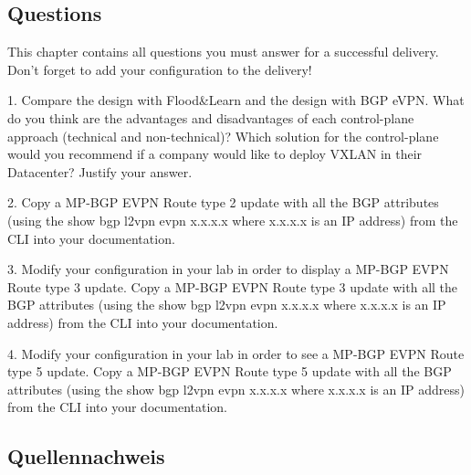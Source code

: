 \documentclass[11pt,titlepage]{article}
\newenvironment{shadedquotation}
 {\begin{shaded*}
  \quoting[leftmargin=0pt, vskip=0pt]
 }
 {\endquoting
 \end{shaded*}
}
\begin{document}
\subsection{Questions}
This chapter contains all questions you must answer for a successful delivery. Don’t forget to add
your configuration to the delivery!
\begin{shadedquotation}
	1. Compare the design with Flood\&Learn and the design with BGP eVPN. What do you 	think are the advantages and disadvantages of each control-plane approach (technical and non-technical)? Which solution for the control-plane would you recommend if a company would like to deploy VXLAN in their Datacenter? Justify your answer.
\end{shadedquotation}
\begin{shadedquotation}
	2. Copy a MP-BGP EVPN Route type 2 update with all the BGP attributes (using the show bgp l2vpn evpn x.x.x.x where x.x.x.x is an IP address) from the CLI into your documentation.
\end{shadedquotation}
\begin{shadedquotation}
	3. Modify your configuration in your lab in order to display a MP-BGP EVPN Route type 3 update. Copy a MP-BGP EVPN Route type 3 update with all the BGP attributes (using the show bgp l2vpn evpn x.x.x.x where x.x.x.x is an IP address) from the CLI into your
	documentation.
\end{shadedquotation}
\begin{shadedquotation}
	4. Modify your configuration in your lab in order to see a MP-BGP EVPN Route type 5 update. Copy a MP-BGP EVPN Route type 5 update with all the BGP attributes (using the show bgp l2vpn evpn x.x.x.x where x.x.x.x is an IP address) from the CLI into your documentation.
\end{shadedquotation}


\subsection{Quellennachweis}
\label{subsec:Quellennachweis}

\begingroup
\renewcommand{\section}[2]{}%


\endgroup  
\end{document}
